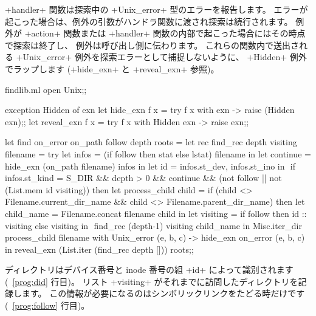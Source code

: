 \ml+handler+ 関数は探索中の \ml+Unix_error+ 型のエラーを報告します。
エラーが起こった場合は、例外の引数がハンドラ関数に渡され探索は続行されます。
例外が \ml+action+ 関数または \ml+handler+ 関数の内部で起こった場合にはその時点で探索は終了し、
例外は呼び出し側に伝わります。
これらの関数内で送出される \ml+Unix_error+ 例外を探索エラーとして捕捉しないように、 \ml+Hidden+ 例外でラップします
(\ml+hide_exn+ と \ml+reveal_exn+ 参照)。
%
\begin{listingcodefile}[style=numbers]{findlib.ml}
open Unix;;

exception Hidden of exn
let hide_exn f x = try f x with exn -> raise (Hidden exn);;
let reveal_exn f x = try f x with Hidden exn -> raise exn;;

let find on_error on_path follow depth roots =
  let rec find_rec depth visiting filename =
    try
      let infos = (if follow then stat else lstat) filename in
      let continue = hide_exn (on_path filename) infos in
      let id = infos.st_dev, infos.st_ino in $\label{prog:did}$
      if infos.st_kind = S_DIR && depth > 0 && continue &&
        (not follow || not (List.mem id visiting))
      then
        let process_child child =
          if (child <> Filename.current_dir_name &&
              child <> Filename.parent_dir_name) then
            let child_name = Filename.concat filename child in
            let visiting =
              if follow then id :: visiting else visiting in $\label{prog:follow}$
            find_rec (depth-1) visiting child_name in
        Misc.iter_dir process_child filename
    with Unix_error (e, b, c) -> hide_exn on_error (e, b, c) in
  reveal_exn (List.iter (find_rec depth [])) roots;;
\end{listingcodefile}

ディレクトリはデバイス番号と inode 番号の組 \ml+id+ によって識別されます (~\ref{prog:did} 行目)。
リスト \ml+visiting+ がそれまでに訪問したディレクトリを記録します。
この情報が必要になるのはシンボリックリンクをたどる時だけです (~\ref{prog:follow} 行目)。

